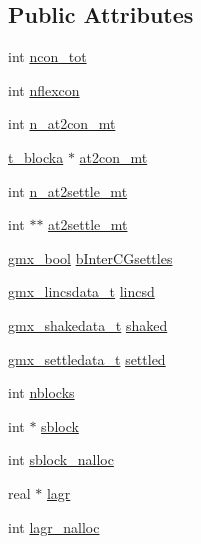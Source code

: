 \subsection*{\-Public \-Attributes}
\begin{DoxyCompactItemize}
\item 
int \hyperlink{structgmx__constr_a73f6e313cf2ffa34ea93244d51aba11c}{ncon\-\_\-tot}
\item 
int \hyperlink{structgmx__constr_a196f4cc1f315220fe039411ef450065a}{nflexcon}
\item 
int \hyperlink{structgmx__constr_ab6918eb1d08923da3b55d00491f2e04a}{n\-\_\-at2con\-\_\-mt}
\item 
\hyperlink{structt__blocka}{t\-\_\-blocka} $\ast$ \hyperlink{structgmx__constr_a05db09c4cf1f83756a9221938a5a03ef}{at2con\-\_\-mt}
\item 
int \hyperlink{structgmx__constr_a3ead3cbf9876e69bf17788b8f3bcc96e}{n\-\_\-at2settle\-\_\-mt}
\item 
int $\ast$$\ast$ \hyperlink{structgmx__constr_a0fdb6ced423b2244abcd97464072fcc3}{at2settle\-\_\-mt}
\item 
\hyperlink{include_2types_2simple_8h_a8fddad319f226e856400d190198d5151}{gmx\-\_\-bool} \hyperlink{structgmx__constr_a830754a1c3d082b498abd4963512d910}{b\-Inter\-C\-Gsettles}
\item 
\hyperlink{include_2types_2constr_8h_a0884037cdae56885954083814a99d970}{gmx\-\_\-lincsdata\-\_\-t} \hyperlink{structgmx__constr_a370c6c2723f7741065f339dec7009cab}{lincsd}
\item 
\hyperlink{include_2types_2constr_8h_ad08049a9cf109e28e0a82b708fa44257}{gmx\-\_\-shakedata\-\_\-t} \hyperlink{structgmx__constr_aadd96b18721f2c775273846cac8b558d}{shaked}
\item 
\hyperlink{include_2types_2constr_8h_a4a1ed00dd48cf2bdee86a5d069f2eea4}{gmx\-\_\-settledata\-\_\-t} \hyperlink{structgmx__constr_a40faca2b2d882b1d153bedafeaa2b935}{settled}
\item 
int \hyperlink{structgmx__constr_a44a082ed0afc5385da0157c674f65937}{nblocks}
\item 
int $\ast$ \hyperlink{structgmx__constr_a9b91b4487f765b86a473526810d214aa}{sblock}
\item 
int \hyperlink{structgmx__constr_ab3f509dff422bfcd5cb2f4b3e4433179}{sblock\-\_\-nalloc}
\item 
real $\ast$ \hyperlink{structgmx__constr_a80ad171f739213af1da38cf2e18690f6}{lagr}
\item 
int \hyperlink{structgmx__constr_a12e648f6750093f7aa4df1b890fd34a5}{lagr\-\_\-nalloc}
$$
\end{DoxyCompactItemize}
